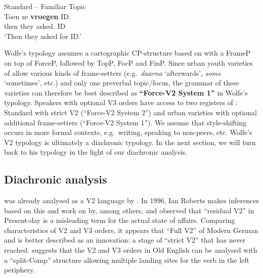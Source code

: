 \documentclass[output=paper]{langsci/langscibook}
\begin{document}
\ea\label{exsbjpro4-ft} Standard  -- Familiar Topic\\
    \gll Toen ze \textbf{vroegen} ID.\\
    then they asked.\Pl{} ID\\
    \trans \enquote*{Then they asked for ID.}
\z

\noindent Wolfe's typology assumes a cartographic CP-structure based on
\citet{Rizzi1997} with a FrameP on top of ForceP, followed by TopP, FocP and
FinP. Since urban youth varieties of  allow various kinds of frame-setters
(e.g.\ \emph{daarna} `afterwards', \emph{soms} `sometimes', etc.) and only one
preverbal topic/focus, the grammar of these varieties can therefore be best
described as \textbf{\enquote{Force-V2 System 1}} in Wolfe's typology. Speakers
with optional V3 orders have access to two registers of : Standard 
with strict V2 (\enquote{Force-V2 System 2}) and urban varieties with optional
additional frame-setters (\enquote{Force-V2 System 1}). We assume that
style-shifting occurs in more formal contexts, e.g.\ writing, speaking to
non-peers, etc.  Wolfe's V2 typology is ultimately a diachronic typology. In
the next section, we will turn back to his typology in the light of our
diachronic analysis.

\subsection{Diachronic analysis}
\label{sec:ana2}

 was already analysed as a V2 language by
\citet{VanKemenade:1987}.  In 1996, Ian Roberts makes inferences based on this
and work on  by, among others, \citet{Kiparsky:1994} and observed
that ``residual V2'' in Present-day  is a misleading term for the
actual state of affairs.  Comparing characteristics of 
V2 and V3 orders, it appears that ``Full
V2'' of Modern German and  is better described as an innovation: a
stage of \enquote{strict V2} that  has never reached.
\textcite{Roberts1996} suggests that the V2 and V3 orders in Old English can be analysed with a ``split-Comp'' structure
allowing multiple landing sites for the verb in the left periphery.
\end{document}
